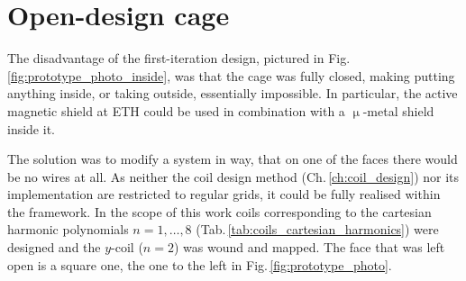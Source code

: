 \section{Open-design cage}
The disadvantage of the first-iteration design, pictured in Fig.\,\ref{fig:prototype_photo_inside}, was that the cage was fully closed, making putting anything inside, or taking outside, essentially impossible. In particular, the active magnetic shield at ETH could be used in combination with a $\upmu$-metal shield inside it.




The solution was to modify a system in way, that on one of the faces there would be no wires at all. As neither the coil design method (Ch.\,\ref{ch:coil_design}) nor its implementation are restricted to regular grids, it could be fully realised within the framework. In the scope of this work coils corresponding to the cartesian harmonic polynomials $n = 1, \ldots, 8$ (Tab.\,\ref{tab:coils_cartesian_harmonics}) were designed and the $y$-coil ($n = 2$) was wound and mapped. The face that was left open is a square one, the one to the left in Fig.\,\ref{fig:prototype_photo}.

